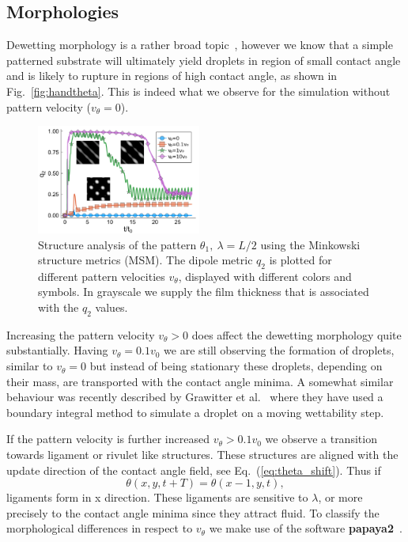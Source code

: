 \documentclass[twocolumn,amsmath,amssymb,showpacs,pre,nofootinbib,superscriptaddress]{revtex4-1} %
\begin{document}
\subsection{Morphologies}\label{subsec:morphme}
Dewetting morphology is a rather broad topic~\cite{becker2003complex, RevModPhys.81.739, PhysRevLett.99.114503, craster2009dynamics, doi:10.1146/annurev-fluid-011212-140734, alizadeh_pahlavan_cueto-felgueroso_hosoi_mckinley_juanes_2018}, however we know that a simple patterned substrate will ultimately yield droplets in region of small contact angle and is likely to rupture in regions of high contact angle, as shown in Fig.~\ref{fig:handtheta}.
This is indeed what we observe for the simulation without pattern velocity ($v_{\theta} = 0$).
\begin{figure}
    \centering
    \includegraphics[width=0.48\textwidth]{Figures/q_2_different_v.pdf}
    \caption{Structure analysis of the pattern $\theta_1,~\lambda=L/2$ using the Minkowski structure metrics (MSM). 
    The dipole metric $q_2$ is plotted for different pattern velocities $v_{\theta}$, displayed with different colors and symbols.
    In grayscale we supply the film thickness that is associated with the $q_2$ values.
    }
    \label{fig:msm_q2}
\end{figure}
Increasing the pattern velocity $v_{\theta} > 0$ does affect the dewetting morphology quite substantially.
Having $v_{\theta} = 0.1 v_0$ we are still observing the formation of droplets, similar to $v_{\theta} = 0$ but instead of being stationary these droplets, depending on their mass, are transported with the contact angle minima.
A somewhat similar behaviour was recently described by Grawitter et al.~\cite{D0SM02082F} where they have used a boundary integral method to simulate a droplet on a moving wettability step.

If the pattern velocity is further increased $v_{\theta} > 0.1 v_0$ we observe a transition towards ligament or rivulet like structures.
These structures are aligned with the update direction of the contact angle field, see Eq.~(\ref{eq:theta_shift}). 
Thus if
\begin{equation*}
    \theta(x,y,t+T) = \theta(x-1, y, t),    
\end{equation*}
ligaments form in x direction.
These ligaments are sensitive to $\lambda$, or more precisely to the contact angle minima since they attract fluid.
To classify the morphological differences in respect to $v_{\theta}$ we make use of the software \textbf{papaya2}~\cite{Schaller2020}.
\end{document}

